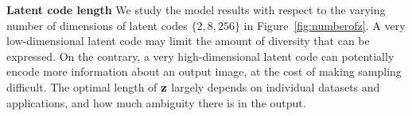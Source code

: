 {\bf Latent code length} We study the \bicycle model results with respect to the varying number of dimensions of latent codes $\{2, 8, 256\}$ in Figure~\ref{fig:numberofz}. A very low-dimensional latent code may limit the amount of diversity that can be expressed. On the contrary, a very high-dimensional latent code can potentially encode more information about an output image, at the cost of making sampling difficult. The optimal length of $\mathbf{z}$ largely depends on individual datasets and applications, and how much ambiguity there is in the output. 

\vspace{-2mm}